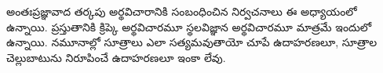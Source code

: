 \documentclass[../../../include/open-logic-chapter]{subfiles}
\begin{document}

\begin{editorial}
  అంతఃప్రజ్ఞావాద తర్కపు అర్థవిచారానికి సంబంధించిన
  నిర్వచనాలు ఈ అధ్యాయంలో ఉన్నాయి. ప్రస్తుతానికి క్రిప్కె
  అర్థవిచారమూ స్థలవిజ్ఞాన అర్థవిచారమూ మాత్రమే ఇందులో ఉన్నాయి. నమూనాల్లో సూత్రాలు ఎలా సత్యమవుతాయో చూపే
  ఉదాహరణలూ, సూత్రాల చెల్లుబాటును నిరూపించే ఉదాహరణలూ
  ఇంకా లేవు.
\end{editorial}


\OLEndChapterHook
\end{document}
